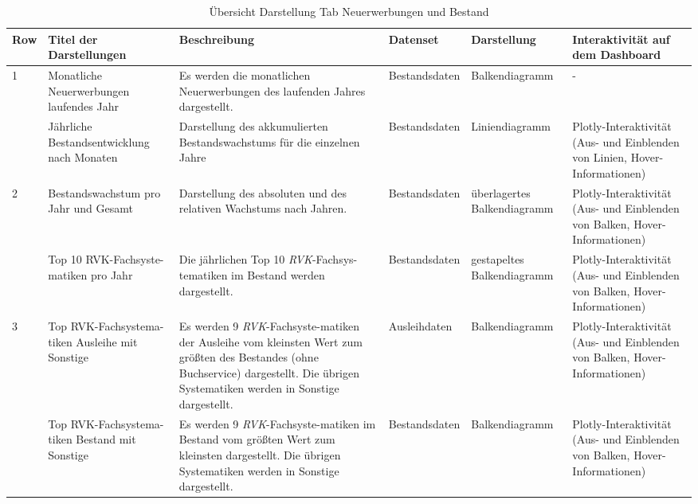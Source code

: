     \begin{table}[H]
        \LARGE
        \centering
        \begin{adjustbox}{max width=\textwidth}
        \begin{tabular}{p{}p{}p{}p{}p{}p{}}
           \toprule
           Row        &Titel der Darstellungen&Beschreibung &Datenset &Darstellung &Interaktivität auf dem Dashboard\\
           \midrule
            1           &Monatliche Neuerwerbungen laufendes Jahr&Es werden die monatlichen Neuerwerbungen des laufenden Jahres dargestellt.&Bestandsdaten&Balkendiagramm&-\\
                        &Jährliche Bestandsentwicklung nach Monaten&Darstellung des akkumulierten Bestandswachstums für die einzelnen Jahre&Bestandsdaten&Liniendiagramm    &Plotly-Interaktivität (Aus- und Einblenden von Linien, Hover-Informationen)\\          
            \midrule
            2           &Bestandswachstum pro Jahr und Gesamt&Darstellung des absoluten und des relativen Wachstums nach Jahren.&Bestandsdaten&überlagertes Balkendiagramm&Plotly-Interaktivität (Aus- und Einblenden von Balken, Hover-Informationen)\\
                        &Top 10 RVK-Fachsyste-matiken pro Jahr&Die jährlichen Top 10 \textit{\acrshort{RVK}}-Fachsys-tematiken im Bestand werden dargestellt.&Bestandsdaten    &gestapeltes Balkendiagramm&Plotly-Interaktivität (Aus- und Einblenden von Balken, Hover-Informationen)\\
            \midrule
            3           &Top RVK-Fachsystema-tiken Ausleihe mit Sonstige&Es werden 9 \textit{\acrshort{RVK}}-Fachsyste-matiken der Ausleihe vom kleinsten Wert zum größten des Bestandes (ohne Buchservice) dargestellt. Die übrigen Systematiken werden in Sonstige dargestellt.&Ausleihdaten&Balkendiagramm&Plotly-Interaktivität (Aus- und Einblenden von Balken, Hover-Informationen)\\
                        &Top RVK-Fachsystema-tiken Bestand mit Sonstige&Es werden  9 \textit{\acrshort{RVK}}-Fachsyste-matiken im Bestand vom größten Wert zum kleinsten dargestellt. Die übrigen Systematiken werden in Sonstige dargestellt.&Bestandsdaten&Balkendiagramm&Plotly-Interaktivität (Aus- und Einblenden von Balken, Hover-Informationen)\\

        \bottomrule
        \end{tabular}
        \end{adjustbox}
        \caption{%
            Übersicht Darstellung Tab Neuerwerbungen und Bestand
        }
        \label{tab:Darstellung Tab Neuerwerbungen und Bestand}
        \end{table}
    \endgroup


